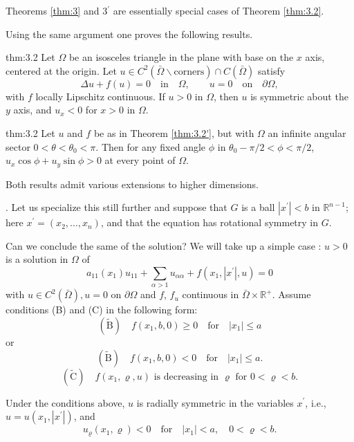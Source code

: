 Theorems \ref{thm:3} and 3$^{\prime}$ are essentially special cases of Theorem \ref{thm:3.2}.

Using the same argument one proves the following results.

\begin{theoremp}{thm:3.2}\label{thm:3.2'}
  Let $\Omega$ be an isosceles triangle in the plane with base on the $x$ axis, centered at the origin. Let $u\in C^2(\bar{\Omega}\backslash\text{corners})\cap C(\bar{\Omega})$ satisfy
  \[ \Delta u+f(u)=0 \quad\text{in}\quad \Omega,\qquad u=0 \quad\text{on}\quad\partial\Omega, \]
  with $f$ locally Lipschitz continuous. If $u > 0$ in $\Omega$, then $u$ is symmetric about the $y$ axis, and $u_x < 0$ for $x > 0$ in $\Omega$.
\end{theoremp}
\begin{theorempp}{thm:3.2}\label{thm:3.2''}
  Let $u$ and $f$ be as in Theorem \ref{thm:3.2'}, but with $\Omega$ an infinite angular sector $0 < \theta < \theta_0 < \pi$. Then for any fixed angle $\phi$ in $\theta_0-\pi/2 < \phi < \pi/2$, $u_x \cos\phi + u_y\sin\phi > 0$ at every point of $\Omega$.
\end{theorempp}

Both results admit various extensions to higher dimensions.\medskip

. Let us specialize this still further and suppose that $G$ is a ball $|x^{\prime}| <b$ in $\mathbb{R}^{n-1}$; here $x^{\prime}= (x_2, \ldots, x_n)$, and that the equation has rotational symmetry in $G$.

Can we conclude the same of the solution? We will take up a simple case : $u > 0$ is a solution in $\Omega$ of
\[ a_{11}(x_1)u_{11} + \sum_{\alpha>1}u_{\alpha\alpha} + f(x_1,|x^{\prime}|,u) = 0 \]
with $u\in C^2(\bar{\Omega}), u=0$ on $\partial\Omega$ and $f$, $f_u$ continuous in $\bar{\Omega}\times\mathbb{R}^{+}$. Assume conditions (B) and (C) in the following form:
\[ \mathrm{(\tilde{B})}\quad f(x_1,b,0)\geq 0 \quad\text{for}\quad|x_1|\leq  a \]
or
\[ \mathrm{(\tilde{B})}\quad f(x_1,b,0)<0 \quad\text{for}\quad|x_1|\leq  a. \]
\[ \mathrm{(\tilde{C})}\quad f(x_1,\varrho,u)\text{ is decreasing in $\varrho$ for $0<\varrho<b$}. \]
\begin{theorem}\label{thm:3.3}
  Under the conditions above, $u$ is radially symmetric in the variables $x^{\prime}$,
  i.e., $u=u(x_1, |x^{\prime}|)$, and
  \[ u_{\varrho}(x_1,\varrho)<0\quad\text{for}\quad |x_1|<a,\quad0<\varrho<b. \]
\end{theorem}


